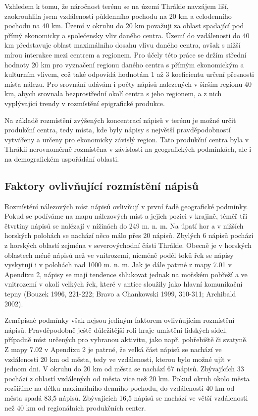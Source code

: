Vzhledem k tomu, že náročnost terénu se na území Thrákie navzájem liší, zaokrouhlila jsem vzdálenosti půldenního pochodu na 20 km a celodenního pochodu na 40 km. Území v okruhu do 20 km považuji za oblast spadající pod přímý ekonomicky a společensky vliv daného centra. Území do vzdálenosti do 40 km představuje oblast maximálního dosahu vlivu daného centra, avšak s nižší mírou interakce mezi centrem a regionem. Pro účely této práce se držím střední hodnoty 20 km pro vyznačení regionu daného centra s přímým ekonomickým a kulturním vlivem, což také odpovídá hodnotám 1 až 3 koeficientu určení přesnosti místa nálezu. Pro srovnání udávám i počty nápisů nalezených v širším regionu 40 km, abych srovnala bezprostřední okolí centra s jeho regionem, a z nich vyplývající trendy v rozmístění epigrafické produkce.

Na základě rozmístění zvýšených koncentrací nápisů v terénu je možné určit produkční centra, tedy místa, kde byly nápisy s největší pravděpodobností vytvářeny a určeny pro ekonomicky závislý region. Tato produkční centra byla v Thrákii nerovnoměrně rozmístěna v závislosti na geografických podmínkách, ale i na demografickém uspořádání oblasti.

\subsection[faktory-ovlivňující-rozmístění-nápisů]{Faktory ovlivňující rozmístění nápisů}

Rozmístění nálezových míst nápisů ovlivňují v první řadě geografické podmínky. Pokud se podíváme na mapu nálezových míst a jejich pozici v krajině, téměř tři čtvrtiny nápisů se nalézají v nížinách do 249 m. n. m. Na úpatí hor a v nižších horských polohách se nachází něco málo přes 20  nápisů. Zbylých 6  nápisů pochází z horských oblastí zejména v severovýchodní části Thrákie. Obecně je v horských oblastech méně nápisů než ve vnitrozemí, nicméně podél toků řek se nápisy vyskytují i v polohách nad 1000 m. n. m. Jak je dále patrné z mapy 7.01 v Apendixu 2, nápisy se mají tendence shlukovat jednak na mořském pobřeží a ve vnitrozemí v okolí velkých řek, které v antice sloužily jako hlavní komunikační tepny (Bouzek 1996, 221-222; Bravo a Chankowski 1999, 310-311; Archibald 2002).

Zeměpisné podmínky však nejsou jediným faktorem ovlivňujícím rozmístění nápisů. Pravděpodobně ještě důležitější roli hraje umístění lidských sídel, případně míst určených pro vybranou aktivitu, jako např. pohřebiště či svatyně. Z mapy 7.02 v Apendixu 2 je patrné, že velká část nápisů se nachází ve vzdálenosti 20 km od města, tedy ve vzdálenosti, kterou bylo možné ujít v jednom dni. V okruhu do 20 km od města se nachází 67  nápisů. Zbývajících 33  pochází z oblastí vzdálených od města více než 20 km. Pokud okruh okolo města rozšíříme na délku maximálního denního pochodu, do vzdálenosti 40 km od města spadá 83,5  nápisů. Zbývajících 16,5  nápisů se nachází ve větší vzdálenosti než 40 km od regionálních produkčních center.

